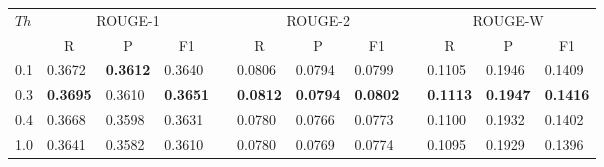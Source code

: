 \setlength{\tabcolsep}{5pt}
\begin{tabular*}{\textwidth}{@{\extracolsep{\fill}}llllllllllll} 
\hline \hline
\multirow{2}{*}{$ Th $}	& \multicolumn{3}{c}{ROUGE-1}	&& \multicolumn{3}{c}{ROUGE-2}	&& \multicolumn{3}{c}{ROUGE-W} \\
\cline{2-4} \cline{6-8} \cline{10-12}
	& \multicolumn{1}{c}{R}		& \multicolumn{1}{c}{P}	& \multicolumn{1}{c}{F1}	&& \multicolumn{1}{c}{R}	& \multicolumn{1}{c}{P}	& \multicolumn{1}{c}{F1}	&& \multicolumn{1}{c}{R}	& \multicolumn{1}{c}{P}	& \multicolumn{1}{c}{F1} \\
\hline
0.1		& 0.3672	& \textbf{0.3612}	& 0.3640	&& 0.0806	& 0.0794	& 0.0799	&& 0.1105	& 0.1946	& 0.1409 \\
0.3		& \textbf{0.3695}	& 0.3610	& \textbf{0.3651}	&& \textbf{0.0812}	& \textbf{0.0794}	& \textbf{0.0802}	&& \textbf{0.1113}	& \textbf{0.1947}	& \textbf{0.1416} \\
0.4		& 0.3668	& 0.3598	& 0.3631	&& 0.0780	& 0.0766	& 0.0773	&& 0.1100	& 0.1932	& 0.1402 \\
1.0		& 0.3641	& 0.3582	& 0.3610	&& 0.0780	& 0.0769	& 0.0774	&& 0.1095	& 0.1929	& 0.1396 \\
\hline \hline
\end{tabular*}


